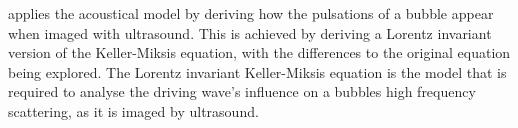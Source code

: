  applies the acoustical model by deriving how the pulsations of a bubble appear when imaged with ultrasound.
This is achieved by deriving a  Lorentz invariant version of the Keller-Miksis equation,
with the 
differences to the original equation being explored.
The Lorentz invariant Keller-Miksis equation is the model that is required 
to analyse the driving wave's influence on a bubbles high frequency scattering, as it is imaged by ultrasound.




